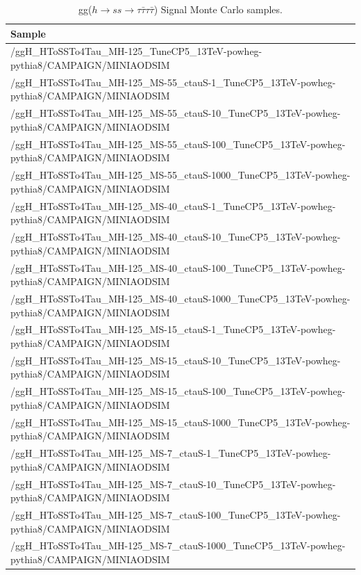 \begin{table}[htb]
  \caption{gg($h \rightarrow ss\rightarrow \tau\bar{\tau} \tau\bar{\tau}$) Signal Monte Carlo samples.}
  \begin{center}
    \scriptsize
    \begin{tabular}{l}\hline
      Sample \\
      \hline
      /ggH\_HToSSTo4Tau\_MH-125\_TuneCP5\_13TeV-powheg-pythia8/CAMPAIGN/MINIAODSIM\\
      \hline
      /ggH\_HToSSTo4Tau\_MH-125\_MS-55\_ctauS-1\_TuneCP5\_13TeV-powheg-pythia8/CAMPAIGN/MINIAODSIM\\
      /ggH\_HToSSTo4Tau\_MH-125\_MS-55\_ctauS-10\_TuneCP5\_13TeV-powheg-pythia8/CAMPAIGN/MINIAODSIM\\
      /ggH\_HToSSTo4Tau\_MH-125\_MS-55\_ctauS-100\_TuneCP5\_13TeV-powheg-pythia8/CAMPAIGN/MINIAODSIM\\
      /ggH\_HToSSTo4Tau\_MH-125\_MS-55\_ctauS-1000\_TuneCP5\_13TeV-powheg-pythia8/CAMPAIGN/MINIAODSIM\\
      /ggH\_HToSSTo4Tau\_MH-125\_MS-40\_ctauS-1\_TuneCP5\_13TeV-powheg-pythia8/CAMPAIGN/MINIAODSIM\\
      /ggH\_HToSSTo4Tau\_MH-125\_MS-40\_ctauS-10\_TuneCP5\_13TeV-powheg-pythia8/CAMPAIGN/MINIAODSIM\\
      /ggH\_HToSSTo4Tau\_MH-125\_MS-40\_ctauS-100\_TuneCP5\_13TeV-powheg-pythia8/CAMPAIGN/MINIAODSIM\\
      /ggH\_HToSSTo4Tau\_MH-125\_MS-40\_ctauS-1000\_TuneCP5\_13TeV-powheg-pythia8/CAMPAIGN/MINIAODSIM\\
      /ggH\_HToSSTo4Tau\_MH-125\_MS-15\_ctauS-1\_TuneCP5\_13TeV-powheg-pythia8/CAMPAIGN/MINIAODSIM\\
      /ggH\_HToSSTo4Tau\_MH-125\_MS-15\_ctauS-10\_TuneCP5\_13TeV-powheg-pythia8/CAMPAIGN/MINIAODSIM\\
      /ggH\_HToSSTo4Tau\_MH-125\_MS-15\_ctauS-100\_TuneCP5\_13TeV-powheg-pythia8/CAMPAIGN/MINIAODSIM\\
      /ggH\_HToSSTo4Tau\_MH-125\_MS-15\_ctauS-1000\_TuneCP5\_13TeV-powheg-pythia8/CAMPAIGN/MINIAODSIM\\
      /ggH\_HToSSTo4Tau\_MH-125\_MS-7\_ctauS-1\_TuneCP5\_13TeV-powheg-pythia8/CAMPAIGN/MINIAODSIM\\
      /ggH\_HToSSTo4Tau\_MH-125\_MS-7\_ctauS-10\_TuneCP5\_13TeV-powheg-pythia8/CAMPAIGN/MINIAODSIM\\
      /ggH\_HToSSTo4Tau\_MH-125\_MS-7\_ctauS-100\_TuneCP5\_13TeV-powheg-pythia8/CAMPAIGN/MINIAODSIM\\
      /ggH\_HToSSTo4Tau\_MH-125\_MS-7\_ctauS-1000\_TuneCP5\_13TeV-powheg-pythia8/CAMPAIGN/MINIAODSIM\\
      \hline
    \end{tabular}
    \label{tab:sigsample}
  \end{center}
\end{table}




